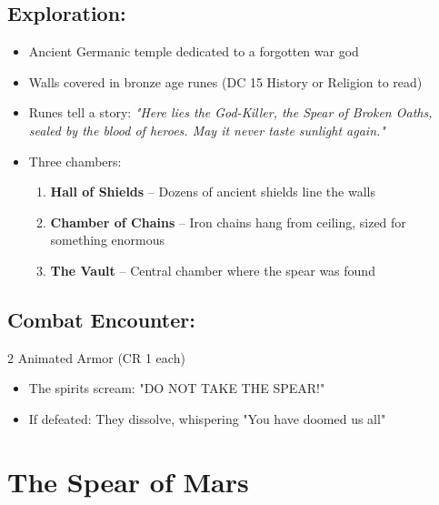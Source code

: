 \documentclass[letterpaper,oneside,twocolumn,openany]{dndbook}
\begin{document}
\subsection{Exploration:}
\begin{itemize}
\item Ancient Germanic temple dedicated to a forgotten war god
\item Walls covered in bronze age runes (DC 15 History or Religion to read)
\item Runes tell a story: \textit{"Here lies the God-Killer, the Spear of Broken Oaths, sealed by the blood of heroes. May it never taste sunlight again."}
\item Three chambers:
  \begin{enumerate}
  \item \textbf{Hall of Shields} – Dozens of ancient shields line the walls
  \item \textbf{Chamber of Chains} – Iron chains hang from ceiling, sized for something enormous
  \item \textbf{The Vault} – Central chamber where the spear was found
  \end{enumerate}
\end{itemize}

\subsection{Combat Encounter:} 2 Animated Armor (CR 1 each)
\begin{itemize}
\item The spirits scream: "DO NOT TAKE THE SPEAR!"
\item If defeated: They dissolve, whispering "You have doomed us all"
\end{itemize}

\section{The Spear of Mars}
\end{document}
